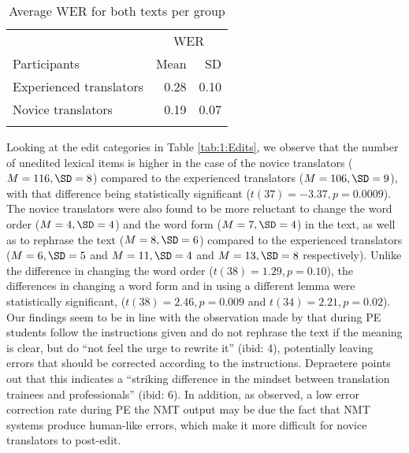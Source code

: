 \documentclass[output=paper]{langscibook}
\begin{document}
\begin{table}
\caption{Average WER for both texts per group}
\label{tab:1:Average WER for both texts per group}
 \begin{tabular}{lrr}
  \lsptoprule
    & \multicolumn{2}{c}{WER} \\
\cmidrule(lr){2-3}
    Participants & Mean & SD\\ 
  \midrule
    Experienced translators & 0.28 & 0.10\\
    Novice translators & 0.19 & 0.07\\
  \lspbottomrule
 \end{tabular}
\end{table}

Looking at the edit categories in Table \ref{tab:1:Edits}, we observe that the number of unedited lexical items is higher in the case of the novice translators ($M = 116,\break \SD = 8$) compared to the experienced translators ($M = 106, \SD = 9$), with that difference being statistically significant ($t(37) = -3.37, p = 0.0009$). The novice translators were also found to be more reluctant to change the word order ($M = 4, \SD = 4$) and the word form ($M = 7, \SD = 4$) in the text, as well as to rephrase the text ($M= 8, \SD= 6$) compared to the experienced translators ($M = 6, \SD = 5$ and $M = 11, \SD = 4$ and $M = 13, \SD = 8$ respectively). Unlike the difference in changing the word order ($t(38) = 1.29, p = 0.10$), the differences in changing a word form and in using a different lemma were statistically significant, ($t(38) = 2.46, p = 0.009$ and $t(34) = 2.21, p = 0.02$). Our findings seem to be in line with the observation made by \citet{Depraetere2010} that during PE students follow the instructions given and do not rephrase the text if the meaning is clear, but do ``not feel the urge to rewrite it'' (ibid: 4), potentially leaving errors that should be corrected according to the instructions. Depraetere points out that this indicates a ``striking difference in the mindset between translation trainees and professionals'' (ibid: 6). In addition, as \citet{Yamada2019} observed, a low error correction rate during PE the NMT output may be due the fact that NMT systems produce human-like errors, which make it more difficult for novice translators to post-edit. 
\end{document}
